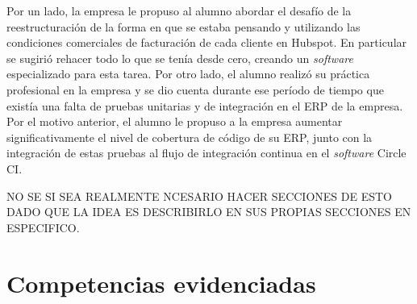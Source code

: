     Por un lado, la empresa le propuso al alumno abordar el desafío de la reestructuración de la forma en que se estaba pensando y utilizando las condiciones comerciales de facturación de cada cliente en Hubspot. En particular se sugirió rehacer todo lo que se tenía desde cero, creando un \textit{software} especializado para esta tarea. Por otro lado, el alumno realizó su práctica profesional en la empresa y se dio cuenta durante ese período de tiempo que existía una falta de pruebas unitarias y de integración en el ERP de la empresa. Por el motivo anterior, el alumno le propuso a la empresa aumentar significativamente el nivel de cobertura de código de su ERP, junto con la integración de estas pruebas al flujo de integración continua en el \textit{software} Circle CI.


NO SE SI SEA REALMENTE NCESARIO HACER SECCIONES DE ESTO DADO QUE LA IDEA ES DESCRIBIRLO EN SUS PROPIAS SECCIONES EN ESPECIFICO.

\section{Competencias evidenciadas}


